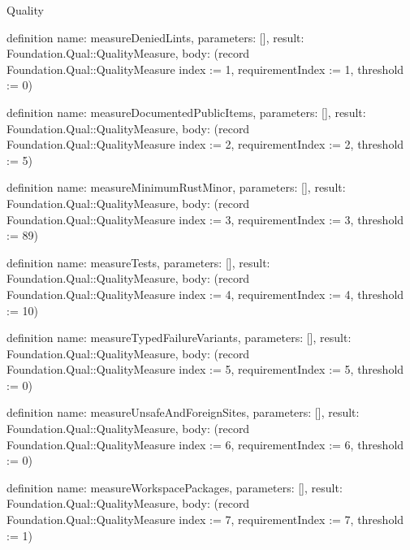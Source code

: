 \begin{lexlean}{Quality}
\begin{semanticmodule}
definition{
  name: measureDeniedLints,
  parameters: [],
  result: Foundation.Qual::QualityMeasure,
  body: (record Foundation.Qual::QualityMeasure {index := 1, requirementIndex := 1, threshold := 0})
}

definition{
  name: measureDocumentedPublicItems,
  parameters: [],
  result: Foundation.Qual::QualityMeasure,
  body: (record Foundation.Qual::QualityMeasure {index := 2, requirementIndex := 2, threshold := 5})
}

definition{
  name: measureMinimumRustMinor,
  parameters: [],
  result: Foundation.Qual::QualityMeasure,
  body: (record Foundation.Qual::QualityMeasure {index := 3, requirementIndex := 3, threshold := 89})
}

definition{
  name: measureTests,
  parameters: [],
  result: Foundation.Qual::QualityMeasure,
  body: (record Foundation.Qual::QualityMeasure {index := 4, requirementIndex := 4, threshold := 10})
}

definition{
  name: measureTypedFailureVariants,
  parameters: [],
  result: Foundation.Qual::QualityMeasure,
  body: (record Foundation.Qual::QualityMeasure {index := 5, requirementIndex := 5, threshold := 0})
}

definition{
  name: measureUnsafeAndForeignSites,
  parameters: [],
  result: Foundation.Qual::QualityMeasure,
  body: (record Foundation.Qual::QualityMeasure {index := 6, requirementIndex := 6, threshold := 0})
}

definition{
  name: measureWorkspacePackages,
  parameters: [],
  result: Foundation.Qual::QualityMeasure,
  body: (record Foundation.Qual::QualityMeasure {index := 7, requirementIndex := 7, threshold := 1})
}
\end{semanticmodule}
\end{lexlean}
